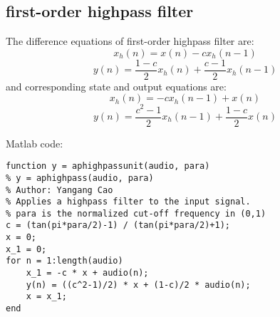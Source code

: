 \documentclass[10pt,a4paper,oneside]{beamer}
\begin{document}
\subsection{first-order highpass filter}
\begin{frame}
The difference equations of first-order highpass filter are: 
\[
x_h(n) = x(n) - cx_h(n-1)
\]
\[
y(n) = \frac{1-c}{2}x_h(n) + \frac{c-1}{2}x_h(n-1)
\]
and corresponding state and output equations are:
\[
x_h(n) = -cx_h(n-1) +x(n)
\]
\[
y(n) = \frac{c^2-1}{2}x_h(n-1) + \frac{1-c}{2}x(n)
\]
\end{frame}
\begin{frame}[fragile]
Matlab code:
\begin{lstlisting}
function y = aphighpassunit(audio, para)
% y = aphighpass(audio, para)
% Author: Yangang Cao
% Applies a highpass filter to the input signal.
% para is the normalized cut-off frequency in (0,1)
c = (tan(pi*para/2)-1) / (tan(pi*para/2)+1);
x = 0;
x_1 = 0;
for n = 1:length(audio)
    x_1 = -c * x + audio(n);
    y(n) = ((c^2-1)/2) * x + (1-c)/2 * audio(n);
    x = x_1;  
end
\end{lstlisting}
\end{frame}
\end{document}
